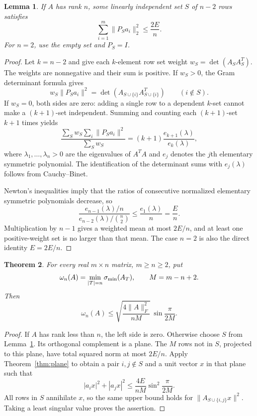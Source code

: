\documentclass[11pt]{article}
\newtheorem{theorem}{Theorem}\newtheorem{lemma}[theorem]{Lemma}
\begin{document}
\begin{lemma}\label{lem:energy}
If $A$ has rank $n$, some linearly independent set $S$ of $n-2$ rows satisfies
\[
 \sum_{i=1}^m\|P_Sa_i\|_2^2\le\frac{2E}{n}.
\]
For $n=2$, use the empty set and $P_S=I$.
\end{lemma}
\begin{proof}
Let $k=n-2$ and give each $k$-element row set weight
$w_S=\det(A_S A_S^T)$. The weights are nonnegative and their sum is positive. If $w_S>0$, the Gram determinant formula gives
\[
 w_S\|P_Sa_i\|^2=\det(A_{S\cup\{i\}}A_{S\cup\{i\}}^T)
 \qquad(i\notin S).
\]
If $w_S=0$, both sides are zero: adding a single row to a dependent $k$-set cannot make a $(k+1)$-set independent. Summing and counting each $(k+1)$-set $k+1$ times yields
\[
 \frac{\sum_S w_S\sum_i\|P_Sa_i\|^2}{\sum_Sw_S}
 =(k+1)\frac{e_{k+1}(\lambda)}{e_k(\lambda)},
\]
where $\lambda_1,\ldots,\lambda_n>0$ are the eigenvalues of $A^T A$ and $e_j$ denotes the $j$th elementary symmetric polynomial. The identification of the determinant sums with $e_j(\lambda)$ follows from Cauchy--Binet.

Newton's inequalities imply that the ratios of consecutive normalized elementary symmetric polynomials decrease, so
\[
 \frac{e_{n-1}(\lambda)/n}{e_{n-2}(\lambda)/\binom n2}
 \le\frac{e_1(\lambda)}{n}=\frac En.
\]
Multiplication by $n-1$ gives a weighted mean at most $2E/n$, and at least one positive-weight set is no larger than that mean. The case $n=2$ is also the direct identity $E=2E/n$.
\end{proof}

\begin{theorem}\label{thm:general}
For every real $m\times n$ matrix, $m\ge n\ge2$, put
\[
 \omega_n(A)=\min_{|T|=n}\sigma_{\min}(A_T),\qquad M=m-n+2.
\]
Then
\[
 \boxed{\quad
 \omega_n(A)\le\sqrt{\frac{4\|A\|_F^2}{nM}}\,
                       \sin\frac\pi{2M}.
 \quad}
\]
\end{theorem}
\begin{proof}
If $A$ has rank less than $n$, the left side is zero. Otherwise choose $S$ from Lemma~\ref{lem:energy}. Its orthogonal complement is a plane. The $M$ rows not in $S$, projected to this plane, have total squared norm at most $2E/n$. Apply Theorem~\ref{thm:plane} to obtain a pair $i,j\notin S$ and a unit vector $x$ in that plane such that
\[
 |a_i x|^2+|a_j x|^2\le\frac{4E}{nM}\sin^2\frac\pi{2M}.
\]
All rows in $S$ annihilate $x$, so the same upper bound holds for $\|A_{S\cup\{i,j\}}x\|^2$. Taking a least singular value proves the assertion.
\end{proof}
\end{document}
